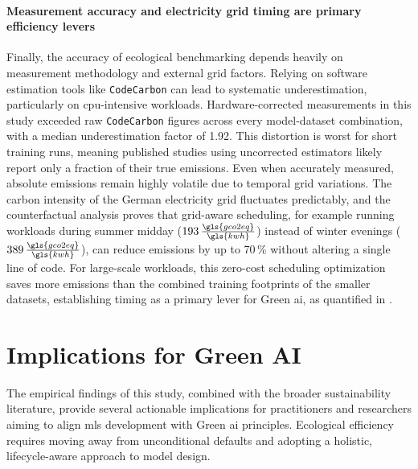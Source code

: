 \paragraph{Measurement accuracy and electricity grid timing are primary efficiency levers}
Finally, the accuracy of ecological benchmarking depends heavily on measurement methodology and external grid factors. Relying on software estimation tools like \texttt{CodeCarbon} can lead to systematic underestimation, particularly on \gls{cpu}-intensive workloads. Hardware-corrected measurements in this study exceeded raw \texttt{CodeCarbon} figures across every model-dataset combination, with a median underestimation factor of 1.92. This distortion is worst for short training runs, meaning published studies using uncorrected estimators likely report only a fraction of their true emissions. Even when accurately measured, absolute emissions remain highly volatile due to temporal grid variations. The carbon intensity of the German electricity grid fluctuates predictably, and the counterfactual analysis proves that grid-aware scheduling, for example running workloads during summer midday ($193\,\frac{\gls{gco2eq}}{\gls{kwh}}$) instead of winter evenings ($389\,\frac{\gls{gco2eq}}{\gls{kwh}}$), can reduce emissions by up to 70\,\% without altering a single line of code. For large-scale workloads, this zero-cost scheduling optimization saves more emissions than the combined training footprints of the smaller datasets, establishing timing as a primary lever for Green \gls{ai}, as quantified in .


\section{Implications for Green AI}
\label{sec:implications}

The empirical findings of this study, combined with the broader sustainability literature, provide several actionable implications for practitioners and researchers aiming to align \glspl{ml} development with Green \gls{ai} principles. Ecological efficiency requires moving away from unconditional defaults and adopting a holistic, lifecycle-aware approach to model design.

